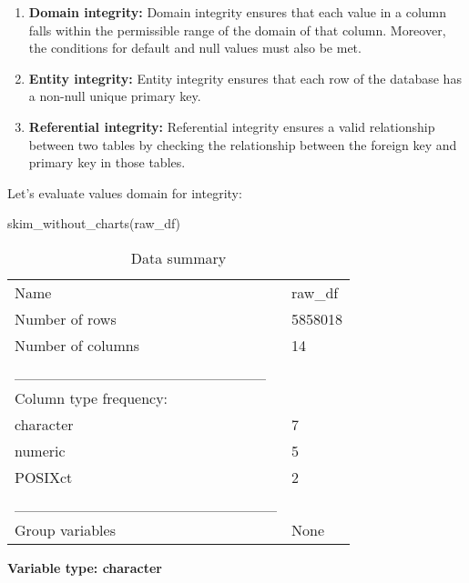 \documentclass[
]{article}
\newenvironment{Shaded}{\begin{snugshade}}{\end{snugshade}}
\newcommand{\FunctionTok}[1]{\textcolor[rgb]{0.00,0.00,0.00}{#1}}
\newcommand{\NormalTok}[1]{#1}
\begin{document}
\begin{enumerate}
\def\labelenumi{\arabic{enumi}.}
\item
  \textbf{Domain integrity:} Domain integrity ensures that each value in
  a column falls within the permissible range of the domain of that
  column. Moreover, the conditions for default and null values must also
  be met.
\item
  \textbf{Entity integrity:} Entity integrity ensures that each row of
  the database has a non-null unique primary key.
\item
  \textbf{Referential integrity:} Referential integrity ensures a valid
  relationship between two tables by checking the relationship between
  the foreign key and primary key in those tables.
\end{enumerate}

Let's evaluate values domain for integrity:

\begin{Shaded}
\begin{Highlighting}[]
\FunctionTok{skim\_without\_charts}\NormalTok{(raw\_df)}
\end{Highlighting}
\end{Shaded}

\begin{longtable}[]{@{}ll@{}}
\caption{Data summary}\tabularnewline
\toprule()
\endhead
Name & raw\_df \\
Number of rows & 5858018 \\
Number of columns & 14 \\
\_\_\_\_\_\_\_\_\_\_\_\_\_\_\_\_\_\_\_\_\_\_\_ & \\
Column type frequency: & \\
character & 7 \\
numeric & 5 \\
POSIXct & 2 \\
\_\_\_\_\_\_\_\_\_\_\_\_\_\_\_\_\_\_\_\_\_\_\_\_ & \\
Group variables & None \\
\bottomrule()
\end{longtable}

\textbf{Variable type: character}
\end{document}
